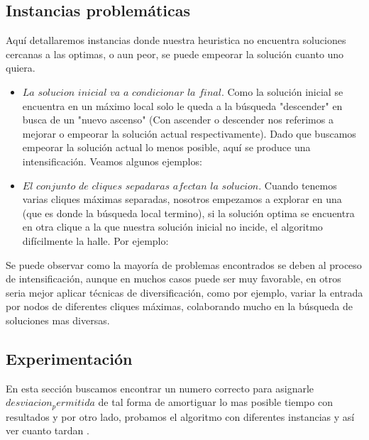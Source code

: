 \subsection{Instancias problemáticas}

 Aquí detallaremos instancias donde nuestra heuristica no encuentra soluciones cercanas a las optimas, o aun peor, se puede empeorar la solución cuanto uno quiera.

\begin{itemize}
 
  \item $La$ $solucion$ $inicial$ $va$ $a$ $condicionar$ $la$ $final$. Como la solución inicial se encuentra en un máximo local solo le queda a la búsqueda "descender" en busca de un "nuevo ascenso" (Con ascender o descender nos referimos a mejorar o empeorar la solución actual respectivamente). Dado que buscamos empeorar la solución actual lo menos posible, aquí se produce una intensificación. Veamos algunos ejemplos:

  \item $El$ $conjunto$ $de$ $cliques$ $sepadaras$ $afectan$ $la$ $solucion$. Cuando tenemos varias cliques máximas separadas, nosotros empezamos a explorar en una (que es donde la búsqueda local termino), si la solución optima se encuentra en otra clique a la que nuestra solución inicial no incide, el algoritmo difícilmente la halle. Por ejemplo:

\end{itemize}

Se puede observar como la mayoría de problemas encontrados se deben al proceso de intensificación, aunque en muchos casos puede ser muy favorable, en otros seria mejor aplicar técnicas de diversificación, como por ejemplo, variar la entrada por nodos de diferentes cliques máximas, colaborando mucho en la búsqueda de soluciones mas diversas.

\subsection{Experimentación}

 En esta sección buscamos encontrar un numero correcto para asignarle $desviacion_permitida$ de tal forma de amortiguar lo mas posible tiempo con resultados y por otro lado, probamos el algoritmo con diferentes instancias y así ver cuanto tardan .
